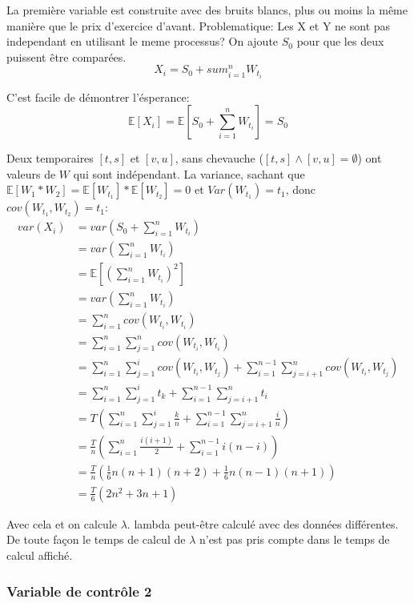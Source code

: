 \documentclass[a4paper,12pt]{scrartcl}
\begin{document}
La première variable est construite avec des bruits blancs, plus ou moins la même manière que le prix d'exercice d'avant.
Problematique: Les X et Y ne sont pas independant en utilisant le meme processus?
On ajoute $S_0$ pour que les deux puissent être comparées.
$$X_i = S_0 + sum_{i=1}^{n} W_{t_i}$$

C'est facile de démontrer l'ésperance:
$$\mathbb{E}[X_i]=\mathbb{E}[S_0 + \sum_{i=1}^{n} W_{t_i}] = S_0$$

Deux temporaires $[t, s]$ et $[v, u]$, sans chevauche ($[t, s] \wedge [v, u] = \emptyset$) ont valeurs de $W$ qui sont indépendant.
La variance, sachant que $\mathbb{E}[W_1*W_2] =\mathbb{E}[W_{t_1}]*\mathbb{E}[W_{t_2}] =0$ et $Var(W_{t_1}) = t_1$, donc  $cov(W_{t_1}, W_{t_2}) = t_1$:
\begin{align*}
var(X_i)
&= var(S_0 + \sum_{i=1}^{n} W_{t_i}) \\
&= var(\sum_{i=1}^{n} W_{t_i}) \\
&= \mathbb{E}[(\sum_{i=1}^{n} W_{t_i})^2] \\
&= var(\sum_{i=1}^{n} W_{t_i}) \\
&= \sum_{i=1}^n cov(W_{t_i}, W_{t_i}) \\
&= \sum_{i=1}^n \sum_{j=1}^n cov(W_{t_i}, W_{t_i}) \\
&= \sum_{i=1}^n \sum_{j=1}^i cov(W_{t_i}, W_{t_j}) + \sum_{i=1}^{n-1} \sum_{j=i+1}^n cov(W_{t_i}, W_{t_j}) \\
&= \sum_{i=1}^n \sum_{j=1}^i t_k + \sum_{i=1}^{n-1} \sum_{j=i+1}^n t_i \\
&= T(\sum_{i=1}^n \sum_{j=1}^i \frac{k}{n} + \sum_{i=1}^{n-1} \sum_{j=i+1}^n \frac{i}{n}) \\
&= \frac{T}{n}(\sum_{i=1}^n \frac{i(i+1)}{2} + \sum_{i=1}^{n-1} i(n-i)) \\
&= \frac{T}{n}(\frac{1}{6}n(n+1)(n+2)+\frac{1}{6}n(n-1)(n+1)) \\
&= \frac{T}{6}(2n^2+3n+1)
\end{align*}

Avec cela et on calcule $\lambda$. lambda peut-être calculé avec des données différentes.
De toute façon le temps de calcul de $\lambda$ n'est pas pris compte dans le temps de calcul affiché.

\subsubsection{Variable de contrôle 2}
\end{document}
